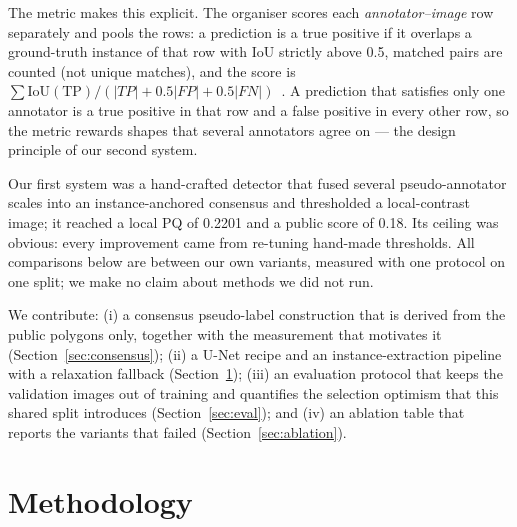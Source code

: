 \documentclass[sigconf]{acmart}
\begin{document}
The metric makes this explicit. The organiser scores each
\emph{annotator--image} row separately and pools the rows: a prediction is a
true positive if it overlaps a ground-truth instance of that row with IoU
strictly above 0.5, matched pairs are counted (not unique matches), and the
score is $\sum\mathrm{IoU}(\mathrm{TP})/(|TP|+0.5|FP|+0.5|FN|)$~\cite{notebook}.
A prediction that satisfies only one
annotator is a true positive in that row and a false positive in every other
row, so the metric rewards shapes that several annotators agree on --- the
design principle of our second system.

Our first system was a hand-crafted detector that fused several pseudo-annotator
scales into an instance-anchored consensus and thresholded a local-contrast
image; it reached a local PQ of 0.2201 and a public score of 0.18. Its ceiling
was obvious: every improvement came from re-tuning hand-made thresholds. All
comparisons below are between our own variants, measured with one protocol on
one split; we make no claim about methods we did not run.

We contribute: (i) a consensus pseudo-label construction that is derived from
the public polygons only, together with the measurement that motivates it
(Section~\ref{sec:consensus}); (ii) a U-Net recipe and an instance-extraction
pipeline with a relaxation fallback (Section~\ref{sec:method}); (iii) an
evaluation protocol that keeps the validation images out of training and
quantifies the selection optimism that this shared split introduces
(Section~\ref{sec:eval}); and
(iv) an ablation table that reports the variants that failed
(Section~\ref{sec:ablation}).

\section{Methodology}
\label{sec:method}
\end{document}
